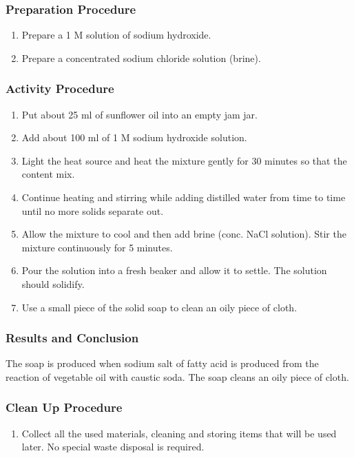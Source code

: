 \subsubsection*{Preparation Procedure}
\begin{enumerate}
\item{Prepare a 1 M solution of sodium hydroxide.}
\item{Prepare a concentrated sodium chloride solution (brine).}
\end{enumerate}

\subsubsection*{Activity Procedure}
\begin{enumerate}
\item{Put about 25 ml of sunflower oil into an empty jam jar.}
\item{Add about 100 ml of 1 M sodium hydroxide solution.}
\item{Light the heat source and heat the mixture gently for 30 minutes so that the content mix.}
\item{Continue heating and stirring while adding distilled water from time to time until no more solids separate out.}
\item{Allow the mixture to cool and then add brine (conc. NaCl solution). Stir the mixture continuously for 5 minutes.}
\item{Pour the solution into a fresh beaker and allow it to settle. The solution should solidify.}
\item{Use a small piece of the solid soap to clean an oily piece of cloth.}
\end{enumerate}

\subsubsection*{Results and Conclusion}
The soap is produced when sodium salt of fatty acid is produced from the reaction of vegetable oil with caustic soda. The soap cleans an oily piece of cloth.

\subsubsection*{Clean Up Procedure}
\begin{enumerate}
\item{Collect all the used materials, cleaning and storing items that will be used later. No special waste disposal is required.}
\end{enumerate}

